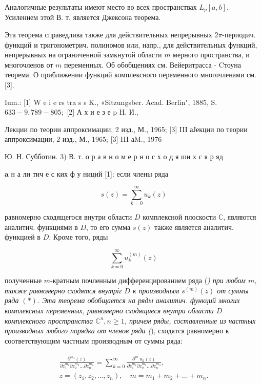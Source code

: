 \documentclass[10pt]{article}
\begin{document}
Аналогичные результаты имеют место во всех пространствах $L_{p}[a, b]$. Усилением этой В. т. является Джексона теорема.



Эта теорема справедлива также для действительных непрерывных $2 \pi$-периодич. функций и тригонометрич. полиномов или, напр., для действительных функций, непрерывных на ограниченной замкнутой области $m$ мерного пространства, и многочленов от $m$ переменных. Об обобщениях см. Вейеритрасса - Cтоуна теорема. О приближении функций комплексного переменного многочленами см. [3].



Ium.: [1] W e i e rs tra s s K., «Sitzungsber. Acad. Berlin", 1885, S. $633-9,789-805 ;$ [2] А х и е з е p H. И.,

Лекции по теории аппроксимации, 2 изд., М., 1965; [3] III аЈекции по теории аппроксимации, 2 изд., М., 1965; [3] III аM., 1976



Ю. Н. Субботин. 3) В. т. о р а в н о м е р н о с х о д я ши х с я р яд

$\mathbf{a}$ н а ли тич е с ких ф у ниций [1]: если члены ряда



\[

s(z)=\sum_{k=0}^{\infty} u_{k}(z)

\]



равномерно сходящегося внутри области $D$ комплексной плоскости $\mathbb{C}$, являются аналитич. функциями в $D$, то его сумма $s(z)$ также является аналитич. функцией в $D$. Кроме того, ряды



\[

\sum_{k=0}^{\infty} u_{k}^{(m)}(z)

\]



полученные $m$-кратным почленным дифференцированием ряда (\textit{) при любом $m$, также равномерно сходятся внутріг $D$ к производным $s^{(m)}(z)$ от суммы ряда $(*)$. Эта теорема обобщается на ряды аналитич. функций многих комплексных переменных, равномерно сходящиеся внутри области $D$ комплексного пространства $\mathbb{C}^{n}, n \geqslant 1$, причем ряды, составленные из частных производных любого порядка от членов ряда (}), сходятся равномерно к соответствующим частным производным от суммы ряда:



\[

\begin{gathered}

\frac{\partial^{m_{s}}(z)}{\partial z_{1}^{m_{1}} \partial z_{2}^{m_{2}} \ldots \partial z_{n}^{m_{n}}}=\sum_{k=0}^{\infty} \frac{\partial^{m^{\prime}} u_{k}(z)}{\partial z_{1}^{m_{1}} \partial z_{2}^{m_{2}} \ldots \partial z_{n}^{m_{n}}}, \\

z=\left(z_{1}, z_{2}, \ldots, z_{n}\right), \quad m=m_{1}+m_{2}+\ldots+m_{n} .

\end{gathered}

\]
\end{document}
